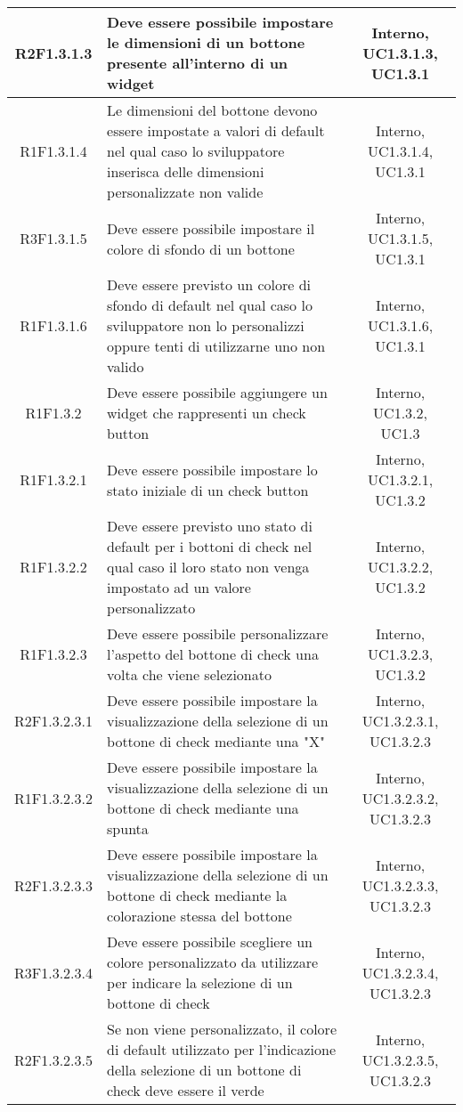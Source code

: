 \begin{longtable}{|c|>{\centering}m{7cm}|c|}
			\hline
			R2F1.3.1.3 & Deve essere possibile impostare le dimensioni di un bottone presente all'interno di un widget & Interno, UC1.3.1.3, UC1.3.1 \\
			\hline
			R1F1.3.1.4 & Le dimensioni del bottone devono essere impostate a valori di default nel qual caso lo sviluppatore inserisca delle dimensioni personalizzate non valide & Interno, UC1.3.1.4, UC1.3.1 \\
			\hline
			R3F1.3.1.5 & Deve essere possibile impostare il colore di sfondo di un bottone & Interno, UC1.3.1.5, UC1.3.1 \\
			\hline
			R1F1.3.1.6 & Deve essere previsto un colore di sfondo di default nel qual caso lo sviluppatore non lo personalizzi oppure tenti di utilizzarne uno non valido & Interno, UC1.3.1.6, UC1.3.1 \\
			\hline
			R1F1.3.2 & Deve essere possibile aggiungere un widget che rappresenti un check button & Interno, UC1.3.2, UC1.3 \\
			\hline
			R1F1.3.2.1 & Deve essere possibile impostare lo stato iniziale di un check button & Interno, UC1.3.2.1, UC1.3.2 \\
		\hline
		R1F1.3.2.2 & Deve essere previsto uno stato di default per i bottoni di check nel qual caso il loro stato non venga impostato ad un valore personalizzato & Interno, UC1.3.2.2, UC1.3.2 \\
		\hline
		R1F1.3.2.3 & Deve essere possibile personalizzare l'aspetto del bottone di check una volta che viene selezionato & Interno, UC1.3.2.3, UC1.3.2 \\
		\hline
		R2F1.3.2.3.1 & Deve essere possibile impostare la visualizzazione della selezione di un bottone di check mediante una "X" & Interno, UC1.3.2.3.1, UC1.3.2.3 \\ 
		\hline
		R1F1.3.2.3.2 & Deve essere possibile impostare la visualizzazione della selezione di un bottone di check mediante una spunta & Interno, UC1.3.2.3.2, UC1.3.2.3 \\ 
		\hline
		R2F1.3.2.3.3 & Deve essere possibile impostare la visualizzazione della selezione di un bottone di check mediante la colorazione stessa del bottone & Interno, UC1.3.2.3.3, UC1.3.2.3 \\ 
		\hline
		R3F1.3.2.3.4 & Deve essere possibile scegliere un colore personalizzato da utilizzare per indicare la selezione di un bottone di check & Interno, UC1.3.2.3.4, UC1.3.2.3 \\ 
		\hline
		R2F1.3.2.3.5 & Se non viene personalizzato, il colore di default utilizzato per l'indicazione della selezione di un bottone di check deve essere il verde & Interno, UC1.3.2.3.5, UC1.3.2.3 \\

\end{longtable}
